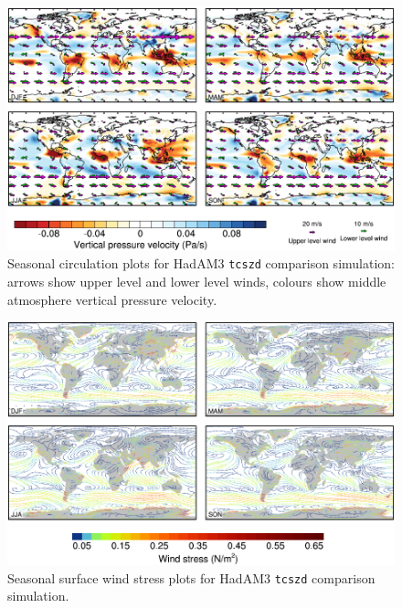 \documentclass[a4paper,11pt]{article}
\begin{document}
\begin{figure}
  \begin{center}
    \includegraphics[width=\textwidth]{../hadam3-comparison/plots/wind-plots}
  \end{center}
  \caption{Seasonal circulation plots for HadAM3 \texttt{tcszd}
    comparison simulation: arrows show upper level and lower level
    winds, colours show middle atmosphere vertical pressure velocity.}
  \label{fig:wind-hadam3}
\end{figure}

\begin{figure}
  \begin{center}
    \includegraphics[width=\textwidth]{../hadam3-comparison/plots/stress-plots}
  \end{center}
  \caption{Seasonal surface wind stress plots for HadAM3
    \texttt{tcszd} comparison simulation.}
  \label{fig:stress-hadam3}
\end{figure}
\end{document}
